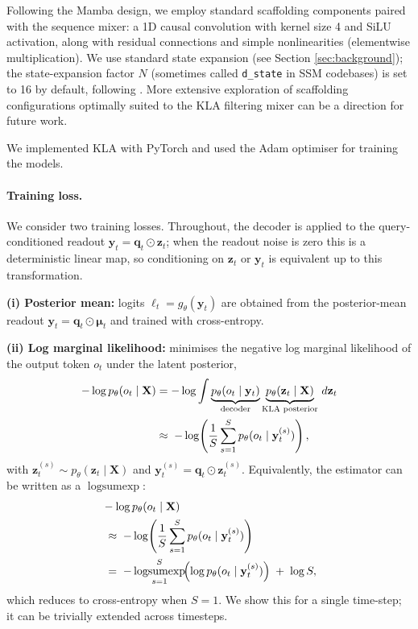 \documentclass{article}
\DeclareMathOperator*{\logsumexp}{logsumexp}
\newcommand{\our}{\textsc{KLA}\xspace}
\begin{document}
Following the Mamba design, we employ standard scaffolding components paired with the sequence mixer: a 1D causal convolution with kernel size 4 and SiLU activation, along with residual connections and simple nonlinearities (elementwise multiplication). We use standard state expansion (see Section \ref{sec:background}); the state-expansion factor $N$ (sometimes called \texttt{d\_state} in SSM codebases) is set to 16 by default, following \citet{gu2023mamba}. More extensive exploration of scaffolding configurations optimally suited to the \our filtering mixer can be a direction for future work.

We implemented \our with PyTorch \citep{paszkePyTorchImperativeStyle2019} and used the Adam optimiser \citep{KingmaB14} for training the models.

\paragraph{Training loss.}
\label{app:loss}
We consider two training losses. Throughout, the decoder is applied to the query-conditioned readout
$\mathbf{y}_t=\mathbf{q}_t\odot \mathbf{z}_t$; when the readout noise is zero this is a deterministic linear map, so conditioning on $\mathbf{z}_t$ or $\mathbf{y}_t$ is equivalent up to this transformation.

\textbf{(i) Posterior mean:} logits $\boldsymbol{\ell}_t = g_\theta(\mathbf{y}_t)$ are obtained from the posterior-mean readout $\mathbf{y}_t=\mathbf{q}_t\odot \boldsymbol{\mu}_t$ and trained with cross-entropy.

\textbf{(ii) Log marginal likelihood:} minimises the negative log marginal likelihood of the output token $o_t$ under the latent posterior,
\begin{align}
-\log p_\theta(o_t \mid \mathbf{X})
&=
-\log \int \underbrace{p_\theta(o_t \mid \mathbf{y}_t)}_{\text{decoder}} \underbrace{p_\theta(\mathbf{z}_t \mid \mathbf{X})}_{\text{\our posterior}}\, d\mathbf{z}_t \nonumber\\
&\approx\;
-\log\!\left(\frac{1}{S}\sum_{s=1}^S p_\theta(o_t \mid \mathbf{y}_t^{(s)})\right),
\label{eq:nmll_integral}
\end{align}
with $\mathbf{z}_t^{(s)}\sim p_\theta(\mathbf{z}_t\mid \mathbf{X})$ and $\mathbf{y}_t^{(s)}=\mathbf{q}_t\odot \mathbf{z}_t^{(s)}$.
Equivalently, the estimator can be written as a $\logsumexp$:
\begin{align}
&-\log p_\theta(o_t \mid \mathbf{X})\notag \\
&\;\approx\;
-\log\!\left(\frac{1}{S}\sum_{s=1}^S p_\theta(o_t \mid \mathbf{y}_t^{(s)})\right) \notag \\
&\;=\;
-\logsumexp_{s=1}^S\!\Bigl(\log p_\theta(o_t \mid \mathbf{y}_t^{(s)})\Bigr) \;+\; \log S,
\label{eq:nmll_logsumexp}
\end{align}
which reduces to cross-entropy when $S{=}1$. We show this for a single time-step; it can be trivially extended across timesteps.
\end{document}
